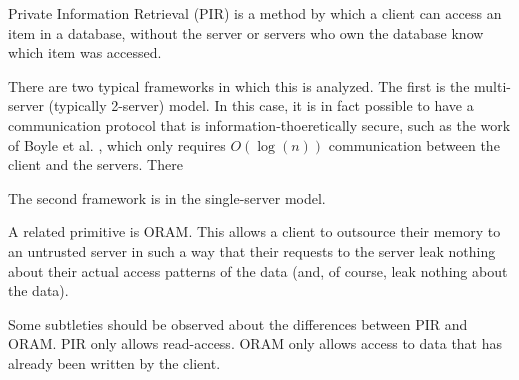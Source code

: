 Private Information Retrieval (PIR) is a method by which
a client can access an item in a database, without the server
or servers who own the database know which item was accessed.

There are two typical frameworks in which this is analyzed.
The first is the multi-server (typically 2-server) model. 
In this case, it is in fact possible to have
a communication protocol that is information-thoeretically 
secure, such as the work of Boyle et al. \cite{boyle2016function}, 
which only requires $O(\log(n))$
communication between the client and the servers.
There 

The second framework is in the single-server model.

A related primitive is ORAM. This allows a client to outsource
their memory to an untrusted server in such a way that their
requests to the server leak nothing about their actual
access patterns of the data (and, of course, leak nothing about
the data). 

Some subtleties should be observed about the differences
between PIR and ORAM.
PIR only allows read-access.
ORAM only allows access to data that has already been written
by the client.  

